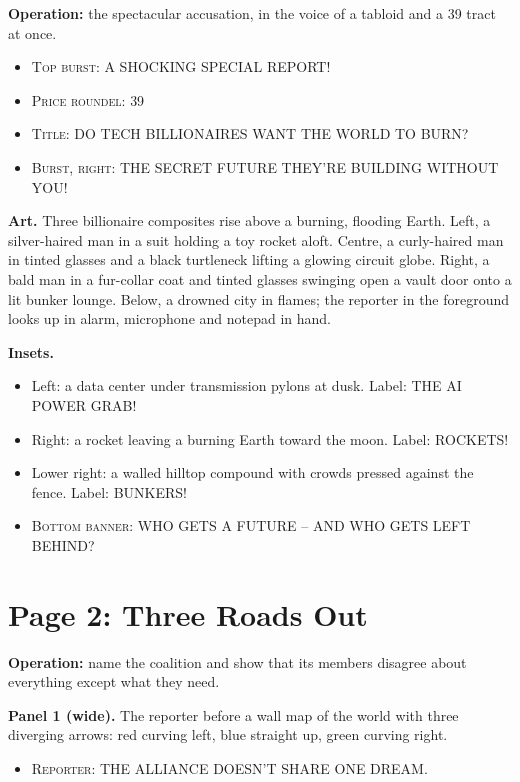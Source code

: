 \documentclass[11pt]{article}
\newcommand{\op}[1]{\textbf{Operation:} #1\par}
\newcommand{\panel}[2]{\textbf{#1.} #2\par}
\newenvironment{lines}{\begin{itemize}[label={},leftmargin=1.5em,itemsep=0.05em,topsep=0.1em]}{\end{itemize}}
\newcommand{\say}[2]{\item \textsc{#1}: \textsf{\small #2}}
\begin{document}
\op{the spectacular accusation, in the voice of a tabloid and a 39\textcent{} tract at once.}

\begin{lines}
\say{Top burst}{A SHOCKING SPECIAL REPORT!}
\say{Price roundel}{39\textcent}
\say{Title}{DO TECH BILLIONAIRES WANT THE WORLD TO BURN?}
\say{Burst, right}{THE SECRET FUTURE THEY'RE BUILDING WITHOUT YOU!}
\end{lines}

\panel{Art}{Three billionaire composites rise above a burning, flooding Earth. Left, a silver-haired man in a suit holding a toy rocket aloft. Centre, a curly-haired man in tinted glasses and a black turtleneck lifting a glowing circuit globe. Right, a bald man in a fur-collar coat and tinted glasses swinging open a vault door onto a lit bunker lounge. Below, a drowned city in flames; the reporter in the foreground looks up in alarm, microphone and notepad in hand.}

\panel{Insets}{}
\begin{itemize}
\item Left: a data center under transmission pylons at dusk. Label: \textsf{\small THE AI POWER GRAB!}
\item Right: a rocket leaving a burning Earth toward the moon. Label: \textsf{\small ROCKETS!}
\item Lower right: a walled hilltop compound with crowds pressed against the fence. Label: \textsf{\small BUNKERS!}
\end{itemize}

\begin{lines}
\say{Bottom banner}{WHO GETS A FUTURE -- AND WHO GETS LEFT BEHIND?}
\end{lines}

\section{Page 2: Three Roads Out}

\op{name the coalition and show that its members disagree about everything except what they need.}

\panel{Panel 1 (wide)}{The reporter before a wall map of the world with three diverging arrows: red curving left, blue straight up, green curving right.}
\begin{lines}\say{Reporter}{THE ALLIANCE DOESN'T SHARE ONE DREAM.}\end{lines}
\end{document}
